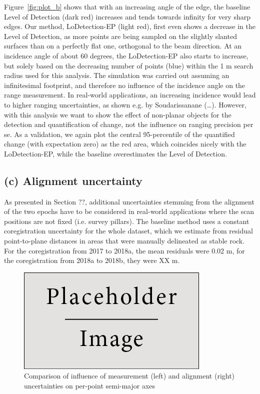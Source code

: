 \documentclass[preprint,12pt,3p]{elsarticle}
\begin{document}
Figure~\ref{fig:plot_b} shows that with an increasing angle of the edge, the baseline Level of Detection (dark red) increases and tends towards infinity for very sharp edges. Our method, LoDetection-EP (light red), first even shows a decrease in the Level of Detection, as more points are being sampled on the slightly slanted surfaces than on a perfectly flat one, orthogonal to the beam direction. At an incidence angle of about 60 degrees, the LoDetection-EP also starts to increase, but solely based on the decreasing number of points (blue) within the 1 m search radius used for this analysis. The simulation was carried out assuming an infinitesimal footprint, and therefore no influence of the incidence angle on the range measurement. In real-world applications, an increasing incidence would lead to higher ranging uncertainties, as shown e.g. by Soudarissanane (…). However, with this analysis we want to show the effect of non-planar objects for the detection and quantification of change, not the influence on ranging precision per se.
As a validation, we again plot the central 95-percentile of the quantified change (with expectation zero) as the red area, which coincides nicely with the LoDetection-EP, while the baseline overestimates the Level of Detection.  

\subsection{(c) Alignment uncertainty}
As presented in Section ??, additional uncertainties stemming from the alignment of the two epochs have to be considered in real-world applications where the scan positions are not fixed (i.e. survey pillars). The baseline method uses a constant coregistration uncertainty for the whole dataset, which we estimate from residual point-to-plane distances in areas that were manually delineated as stable rock. For the coregistration from 2017 to 2018a, the mean residuals were 0.02 m, for the coregistration from 2018a to 2018b, they were XX m.


\begin{figure}
    \centering
    \includegraphics[width=0.9\linewidth]{placeholder.jpg}
    \caption{Comparison of influence of measurement (left) and alignment (right) uncertainties on per-point semi-major axes}
    \label{fig:plot_c}
\end{figure}
\end{document}
